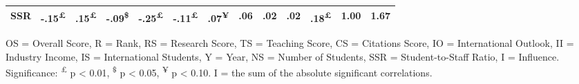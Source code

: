 \documentclass{singlecol-new}
\theoremstyle{TH}{
\newtheorem{lemma}{Lemma}
\newtheorem{theorem}[lemma]{Theorem}
\newtheorem{corrolary}[lemma]{Corrolary}
\newtheorem{conjecture}[lemma]{Conjecture}
\newtheorem{proposition}[lemma]{Proposition}
\newtheorem{claim}[lemma]{Claim}
\newtheorem{stheorem}[lemma]{Wrong Theorem}
\newtheorem{algorithm}{Algorithm}
}
\theoremstyle{THrm}{
\newtheorem{definition}{Definition}[section]
\newtheorem{question}{Question}[section]
\newtheorem{remark}{Remark}
\newtheorem{scheme}{Scheme}
}
\theoremstyle{THhit}{
\newtheorem{case}{Case}[section]
}
\begin{document}
\begin{table*}[h!]
\begin{tabular}{lrrrrrrrrrrrr}
		SSR & \cellcolor{gray!07}-.15\textsuperscript{£} & \cellcolor{gray!07}.15\textsuperscript{£} & \cellcolor{gray!05}-.09\textsuperscript{\$} & \cellcolor{gray!13}-.25\textsuperscript{£} & \cellcolor{gray!05}-.11\textsuperscript{£} & \cellcolor{gray!04}.07\textsuperscript{¥} & \cellcolor{gray!03}.06 & \cellcolor{gray!01}.02 & \cellcolor{gray!01}.02 & \cellcolor{gray!09}.18\textsuperscript{£} & \cellcolor{gray!50}1.00 & 1.67 \\
		 
		\hline
		
	\end{tabular}
	\vspace{1mm}
	
	\scriptsize
	OS = Overall Score, R = Rank, RS = Research Score, TS = Teaching Score, CS = Citations Score, IO = International Outlook, II = Industry Income, IS = International Students, Y = Year, NS = Number of Students, SSR = Student-to-Staff Ratio, I = Influence.
	Significance: \textsuperscript{£} p < 0.01, \textsuperscript{\$} p < 0.05, \textsuperscript{¥} p < 0.10. I = the sum of the absolute significant correlations.
\end{table*}
\end{document}
